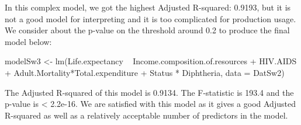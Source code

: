 In this complex model, we got the highest Adjusted R-squared: 0.9193, but it is not a good model for interpreting and it is too complicated for production usage. We consider about the p-value on the threshold around 0.2 to produce the final model below:

modelSw3 <- lm(Life.expectancy ~ Income.composition.of.resources + HIV.AIDS + Adult.Mortality*Total.expenditure + Status * Diphtheria, data = DatSw2)

The Adjusted R-squared of this model is 0.9134. The F-statistic is 193.4 and the p-value is < 2.2e-16. We are satisfied with this model as it gives a good Adjusted R-squared as well as a relatively acceptable number of predictors in the model.
